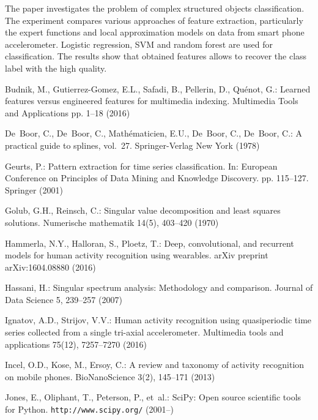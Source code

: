 \documentclass{llncs}
\begin{document}
The paper investigates the problem of complex structured objects classification.
The experiment compares various approaches of feature extraction, particularly the expert functions and local approximation models on data from smart phone accelerometer.
Logistic regression, SVM and random forest are used for classification. 
The results show that obtained features allows to recover the class label with the high quality.

\begin{thebibliography}{10}
	\providecommand{\url}[1]{\texttt{#1}}
	\providecommand{\urlprefix}{URL }
	
	Budnik, M., Gutierrez-Gomez, E.L., Safadi, B., Pellerin, D., Qu{\'e}not, G.:
	Learned features versus engineered features for multimedia indexing.
	Multimedia Tools and Applications pp. 1--18 (2016)
	
	De~Boor, C., De~Boor, C., Math{\'e}maticien, E.U., De~Boor, C., De~Boor, C.: A
	practical guide to splines, vol.~27. Springer-Verlag New York (1978)
	
	Geurts, P.: Pattern extraction for time series classification. In: European
	Conference on Principles of Data Mining and Knowledge Discovery. pp.
	115--127. Springer (2001)
	
	Golub, G.H., Reinsch, C.: Singular value decomposition and least squares
	solutions. Numerische mathematik  14(5),  403--420 (1970)
	
	Hammerla, N.Y., Halloran, S., Ploetz, T.: Deep, convolutional, and recurrent
	models for human activity recognition using wearables. arXiv preprint
	arXiv:1604.08880  (2016)
	
	Hassani, H.: Singular spectrum analysis: Methodology and comparison. Journal of
	Data Science  5,  239--257 (2007)
	
	Ignatov, A.D., Strijov, V.V.: Human activity recognition using quasiperiodic
	time series collected from a single tri-axial accelerometer. Multimedia tools
	and applications  75(12),  7257--7270 (2016)
	
	Incel, O.D., Kose, M., Ersoy, C.: A review and taxonomy of activity recognition
	on mobile phones. BioNanoScience  3(2),  145--171 (2013)
	
	Jones, E., Oliphant, T., Peterson, P., et~al.: {SciPy}: Open source scientific
	tools for {Python}. \url{http://www.scipy.org/} (2001--)
	

\end{thebibliography}
\end{document}
